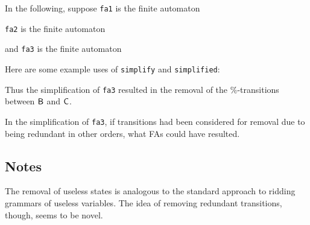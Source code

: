In the following, suppose \texttt{fa1} is the finite automaton
\begin{center}

\end{center}
\texttt{fa2} is the finite automaton
\begin{center}

\end{center}
and \texttt{fa3} is the finite automaton
\begin{center}

\end{center}
Here are some example uses of \texttt{simplify} and \texttt{simplified}:

Thus the simplification of \texttt{fa3} resulted in the removal of
the $\%$-transitions between $\mathsf{B}$ and $\mathsf{C}$.

\begin{exercise}
In the simplification of \texttt{fa3}, if transitions had been
considered for removal due to being redundant in other orders,
what FAs could have resulted.
\end{exercise}

%
%

\subsection{Notes}

The removal of useless states is analogous to the standard approach to
ridding grammars of useless variables.  The idea of removing redundant
transitions, though, seems to be novel.

